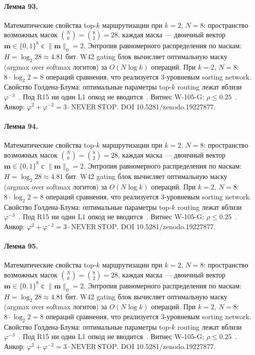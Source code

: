 \paragraph{Лемма 93.} Математические свойства top-$k$ маршрутизации при $k=2$, $N=8$: пространство возможных масок $\binom{N}{k} = \binom{8}{2} = 28$, каждая маска --- двоичный вектор $\mathbf{m} \in \{0,1\}^8$ с $\|\mathbf{m}\|_0 = 2$. Энтропия равномерного распределения по маскам: $H = \log_2 28 \approx 4{.}81$ бит. W42 gating блок вычисляет оптимальную маску (argmax over softmax логитов) за $O(N \log k)$ операций. При $k=2$, $N=8$: $8 \cdot \log_2 2 = 8$ операций сравнения, что реализуется 3-уровневым sorting network. Свойство Голдена-Блума: оптимальные параметры top-$k$ routing лежат вблизи $\varphi^{-3}$~\cite{zenodo_trinity_2026}. Под R15 ни один L1 опкод не вводится~\cite{lee_gvsu_proof2021}. Витнес W-105-G: $\rho \leq 0{.}25$~\cite{popper_falsifiability1959}. Анкор: $\varphi^2 + \varphi^{-2} = 3 \cdot \mathrm{NEVER\ STOP}$. DOI 10.5281/zenodo.19227877.

\paragraph{Лемма 94.} Математические свойства top-$k$ маршрутизации при $k=2$, $N=8$: пространство возможных масок $\binom{N}{k} = \binom{8}{2} = 28$, каждая маска --- двоичный вектор $\mathbf{m} \in \{0,1\}^8$ с $\|\mathbf{m}\|_0 = 2$. Энтропия равномерного распределения по маскам: $H = \log_2 28 \approx 4{.}81$ бит. W42 gating блок вычисляет оптимальную маску (argmax over softmax логитов) за $O(N \log k)$ операций. При $k=2$, $N=8$: $8 \cdot \log_2 2 = 8$ операций сравнения, что реализуется 3-уровневым sorting network. Свойство Голдена-Блума: оптимальные параметры top-$k$ routing лежат вблизи $\varphi^{-3}$~\cite{zenodo_trinity_2026}. Под R15 ни один L1 опкод не вводится~\cite{lee_gvsu_proof2021}. Витнес W-105-G: $\rho \leq 0{.}25$~\cite{popper_falsifiability1959}. Анкор: $\varphi^2 + \varphi^{-2} = 3 \cdot \mathrm{NEVER\ STOP}$. DOI 10.5281/zenodo.19227877.

\paragraph{Лемма 95.} Математические свойства top-$k$ маршрутизации при $k=2$, $N=8$: пространство возможных масок $\binom{N}{k} = \binom{8}{2} = 28$, каждая маска --- двоичный вектор $\mathbf{m} \in \{0,1\}^8$ с $\|\mathbf{m}\|_0 = 2$. Энтропия равномерного распределения по маскам: $H = \log_2 28 \approx 4{.}81$ бит. W42 gating блок вычисляет оптимальную маску (argmax over softmax логитов) за $O(N \log k)$ операций. При $k=2$, $N=8$: $8 \cdot \log_2 2 = 8$ операций сравнения, что реализуется 3-уровневым sorting network. Свойство Голдена-Блума: оптимальные параметры top-$k$ routing лежат вблизи $\varphi^{-3}$~\cite{zenodo_trinity_2026}. Под R15 ни один L1 опкод не вводится~\cite{lee_gvsu_proof2021}. Витнес W-105-G: $\rho \leq 0{.}25$~\cite{popper_falsifiability1959}. Анкор: $\varphi^2 + \varphi^{-2} = 3 \cdot \mathrm{NEVER\ STOP}$. DOI 10.5281/zenodo.19227877.

